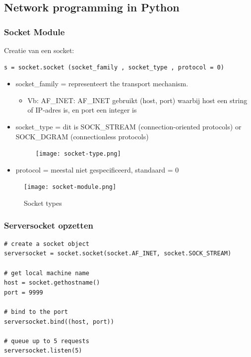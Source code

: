 \documentclass{article}
\begin{document}
\subsection{Network programming in Python}

\subsubsection{Socket Module}

Creatie van een socket:

\begin{verbatim}
s = socket.socket (socket_family , socket_type , protocol = 0)
\end{verbatim}

\begin{itemize}
    \item socket\_family = representeert the transport mechanism.
    \begin{itemize}
        \item Vb: AF\_INET: AF\_INET gebruikt (host, port) waarbij host een string of IP-adres is, en port een integer is
    \end{itemize}
    \item socket\_type = dit is SOCK\_STREAM (connection-oriented protocols) or SOCK\_DGRAM (connectionless protocols)
    \begin{figure}[H]
        \centering
        \texttt{[image: socket-type.png]}
    \end{figure}
    \item protocol = meestal niet gespecificeerd, standaard = 0    
\end{itemize}


\begin{figure}[H]
    \centering
    \texttt{[image: socket-module.png]}
    \caption{Socket types}
\end{figure}


\subsubsection{Serversocket opzetten}

\begin{verbatim}
# create a socket object
serversocket = socket.socket(socket.AF_INET, socket.SOCK_STREAM)

# get local machine name
host = socket.gethostname()
port = 9999

# bind to the port
serversocket.bind((host, port))

# queue up to 5 requests
serversocket.listen(5)
\end{verbatim}
\end{document}
